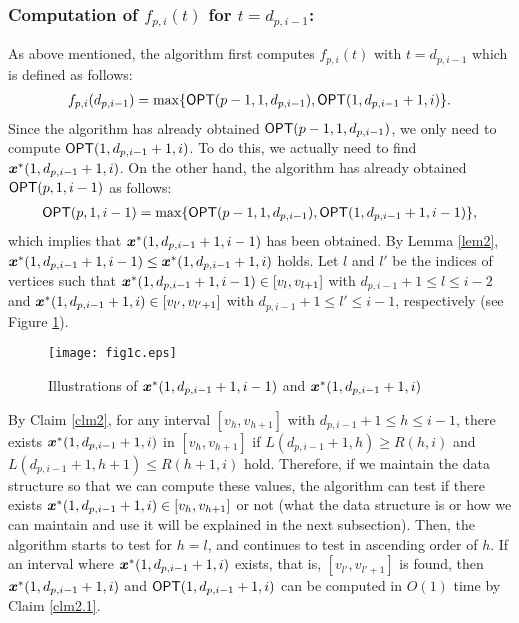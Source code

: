 \documentclass[a4paper]{llncs}
\newcommand{\bm}[1]{\mbox{\boldmath{$#1$}}}
\begin{document}
\subsubsection{Computation of $f_{p, i}(t)$ for $t = d_{p, i-1}$:}
As above mentioned, the algorithm first computes $f_{p, i}(t)$ with $t = d_{p, i-1}$ which is defined as follows:
\begin{eqnarray}
f_{p, i}(d_{p, i-1}) = 	\max \{ {\sf OPT}(p-1, 1, d_{p, i-1}), {\sf OPT}(1, d_{p, i-1}+1, i) \}. \label{eq11}
\end{eqnarray}
Since the algorithm has already obtained ${\sf OPT}(p-1, 1, d_{p, i-1})$,
we only need to compute ${\sf OPT}(1, d_{p, i-1}+1, i)$.
To do this, we actually need to find ${\bm x}^*(1, d_{p, i-1}+1, i)$.
On the other hand, the algorithm has already obtained ${\sf OPT}(p, 1, i-1)$ as follows:
\begin{eqnarray}
{\sf OPT}(p, 1, i-1) = 	\max \{ {\sf OPT}(p-1, 1, d_{p, i-1}), {\sf OPT}(1, d_{p, i-1}+1, i-1) \}, \label{eq12}
\end{eqnarray}
which implies that ${\bm x}^*(1, d_{p, i-1}+1, i-1)$ has been obtained.
By Lemma \ref{lem2}, ${\bm x}^*(1, d_{p, i-1}+1, i-1) \le {\bm x}^*(1, d_{p, i-1}+1, i)$ holds.
Let $l$ and $l'$ be the indices of vertices  
such that ${\bm x}^*(1, d_{p, i-1}+1, i-1) \in [v_{l}, v_{l+1}]$ with $d_{p, i-1}+1 \le l \le i-2$
and ${\bm x}^*(1, d_{p, i-1}+1, i) \in [v_{l'}, v_{l'+1}]$ with $d_{p, i-1}+1 \le l' \le i-1$, respectively (see Figure \ref{fig1}).
\begin{figure}[h]
\centering
\texttt{[image: fig1c.eps]} 
\caption{Illustrations of ${\bm x}^*(1, d_{p, i-1}+1, i-1)$ and ${\bm x}^*(1, d_{p, i-1}+1, i)$}
\label{fig1}
\end{figure}
By Claim \ref{clm2}, for any interval $[v_h, v_{h+1}]$ with $d_{p, i-1}+1 \le h \le i-1$, there exists ${\bm x}^*(1, d_{p, i-1}+1, i)$ in $[v_h, v_{h+1}]$
if $L(d_{p, i-1}+1, h) \ge R(h, i)$ and $L(d_{p, i-1}+1, h+1) \le R(h+1, i)$ hold.
Therefore, if we maintain the data structure so that we can compute these values,
the algorithm can test if there exists ${\bm x}^*(1, d_{p, i-1}+1, i) \in [v_h, v_{h+1}]$ or not
(what the data structure is or how we can maintain and use it will be explained in the next subsection).
Then, the algorithm starts to test for $h=l$,
and continues to test in ascending order of $h$.
If an interval where ${\bm x}^*(1, d_{p, i-1}+1, i)$ exists, that is, $[v_{l'}, v_{l'+1}]$ is found,
then ${\bm x}^*(1, d_{p, i-1}+1, i)$ and ${\sf OPT}(1, d_{p, i-1}+1, i)$ can be computed in $O(1)$ time by Claim \ref{clm2.1}.
\end{document}
